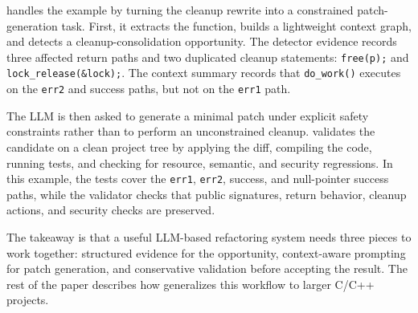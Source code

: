 \SysName{} handles the example by turning the cleanup rewrite into a constrained
patch-generation task. First, it extracts the function, builds a lightweight
context graph, and detects a cleanup-consolidation opportunity. The detector
evidence records three affected return paths and two duplicated cleanup
statements: \texttt{free(p);} and \texttt{lock\_release(\&lock);}. The context
summary records that \texttt{do\_work()} executes on the \texttt{err2} and
success paths, but not on the \texttt{err1} path.

The LLM is then asked to generate a minimal patch under explicit safety
constraints rather than to perform an unconstrained cleanup. \SysName{} validates
the candidate on a clean project tree by applying the diff, compiling the code,
running tests, and checking for resource, semantic, and security regressions. In
this example, the tests cover the \texttt{err1}, \texttt{err2}, success, and
null-pointer success paths, while the validator checks that public signatures,
return behavior, cleanup actions, and security checks are preserved.

The takeaway is that a useful LLM-based refactoring system needs three pieces to
work together: structured evidence for the opportunity, context-aware prompting
for patch generation, and conservative validation before accepting the result.
The rest of the paper describes how \SysName{} generalizes this workflow to
larger C/C++ projects.
